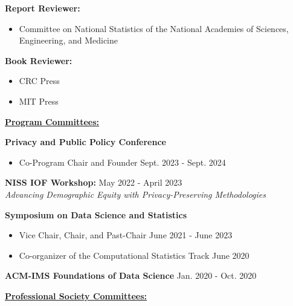 \vspace{-2pt}
\textbf{Report Reviewer:}
\begin{itemize}
    \item Committee on National Statistics of the National Academies of Sciences, Engineering, and Medicine
\end{itemize}

\vspace{5pt}
\textbf{Book Reviewer:}
\vspace{-10pt}
\begin{multicols}{2}
    \begin{itemize}
        \item CRC Press
        \item MIT Press
    \end{itemize}
\end{multicols}

\vspace{-5pt}
\underline{\textbf{\large Program Committees:}}\normalsize

\textbf{Privacy and Public Policy Conference}
\begin{itemize}
    \item Co-Program Chair and Founder \hfill Sept. 2023 - Sept. 2024
\end{itemize}
\professionalspace

\textbf{NISS IOF Workshop:} \hfill May 2022 - April 2023\\
\textit{Advancing Demographic Equity with Privacy-Preserving Methodologies}
\professionalspace

\textbf{Symposium on Data Science and Statistics}
\begin{itemize}
    \item Vice Chair, Chair, and Past-Chair \hfill June 2021 - June 2023
    \item Co-organizer of the Computational Statistics Track \hfill June 2020
\end{itemize}
\leadershipspace
\textbf{ACM-IMS Foundations of Data Science} \hfill Jan. 2020 - Oct. 2020

\professionalspace
\underline{\textbf{\large Professional Society Committees:}}\normalsize

